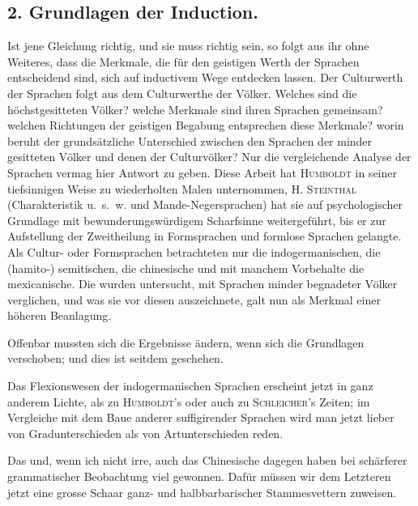 \subsection*{2. Grundlagen der Induction.}\label{IV.IV.2}

Ist jene Gleichung richtig, und sie muss richtig sein, so folgt aus ihr ohne Weiteres, dass die Merkmale, die für den geistigen Werth der Sprachen entscheidend sind, sich auf inductivem Wege entdecken lassen. Der Culturwerth der Sprachen folgt aus dem Culturwerthe der Völker. Welches sind die höchstgesitteten Völker? welche Merkmale sind ihren Sprachen gemeinsam? welchen Richtungen der geistigen Begabung entsprechen diese Merkmale? worin beruht der grundsätzliche Unterschied zwischen den Sprachen der minder gesitteten Völker und denen der Culturvölker? Nur die vergleichende Analyse der Sprachen vermag hier Antwort zu geben. Diese Arbeit hat \textsc{Humboldt} in seiner tiefsinnigen Weise zu wiederholten Malen unternommen, \textsc{H. Steinthal} (Charakteristik u.~s.~w. und Mande-Negersprachen) hat sie auf psychologischer Grundlage mit bewunderungswürdigem Scharfsinne weitergeführt, bis er zur Aufstellung der Zweitheilung in Formsprachen und formlose Sprachen gelangte. Als Cultur- oder Formsprachen betrachteten  nur die indogermanischen, die \mbox{(hamito-)} semitischen, die chinesische und mit manchem Vorbehalte die mexicanische. Die wurden untersucht, mit Sprachen minder begnadeter Völker verglichen, und was sie vor diesen auszeichnete, galt nun als Merkmal einer höheren Beanlagung. 

\label{fp.373} \label{sp.389}

Offenbar mussten sich die Ergebnisse ändern, wenn sich die Grundlagen verschoben; und dies ist seitdem geschehen.

Das Flexionswesen der indogermanischen Sprachen erscheint jetzt in ganz anderem Lichte, als zu \textsc{Humboldt}’s oder auch zu \textsc{Schleicher}’s Zeiten; im Vergleiche mit dem Baue anderer suffigirender Sprachen wird man jetzt lieber von Gradunterschieden als von Artunterschieden reden.

Das  und, wenn ich nicht irre, auch das Chinesische dagegen haben bei schärferer grammatischer Beobachtung viel gewonnen. Dafür müssen wir dem Letzteren jetzt eine grosse Schaar ganz- und halbbarbarischer Stammesvettern zuweisen.

